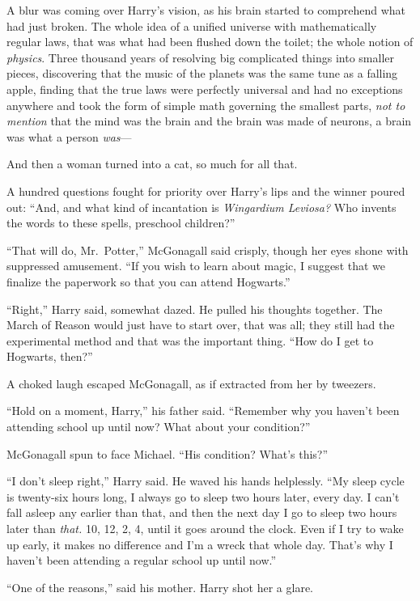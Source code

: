 A blur was coming over Harry’s vision, as his brain started to comprehend what had just broken. The whole idea of a unified universe with mathematically regular laws, that was what had been flushed down the toilet; the whole notion of \emph{physics}. Three thousand years of resolving big complicated things into smaller pieces, discovering that the music of the planets was the same tune as a falling apple, finding that the true laws were perfectly universal and had no exceptions anywhere and took the form of simple math governing the smallest parts, \emph{not to mention} that the mind was the brain and the brain was made of neurons, a brain was what a person \emph{was}—

And then a woman turned into a cat, so much for all that.

A hundred questions fought for priority over Harry’s lips and the winner poured out: “And, and what kind of incantation is \emph{Wingardium Leviosa?} Who invents the words to these spells, preschool children?”

“That will do, Mr.~Potter,” McGonagall said crisply, though her eyes shone with suppressed amusement. “If you wish to learn about magic, I suggest that we finalize the paperwork so that you can attend Hogwarts.”

“Right,” Harry said, somewhat dazed. He pulled his thoughts together. The March of Reason would just have to start over, that was all; they still had the experimental method and that was the important thing. “How do I get to Hogwarts, then?”

A choked laugh escaped McGonagall, as if extracted from her by tweezers.

“Hold on a moment, Harry,” his father said. “Remember why you haven’t been attending school up until now? What about your condition?”

McGonagall spun to face Michael. “His condition? What’s this?”

“I don’t sleep right,” Harry said. He waved his hands helplessly. “My sleep cycle is twenty-six hours long, I always go to sleep two hours later, every day. I can’t fall asleep any earlier than that, and then the next day I go to sleep two hours later than \emph{that.} 10\PM, 12\AM, 2\AM, 4\AM, until it goes around the clock. Even if I try to wake up early, it makes no difference and I’m a wreck that whole day. That’s why I haven’t been attending a regular school up until now.”

“One of the reasons,” said his mother. Harry shot her a glare.

